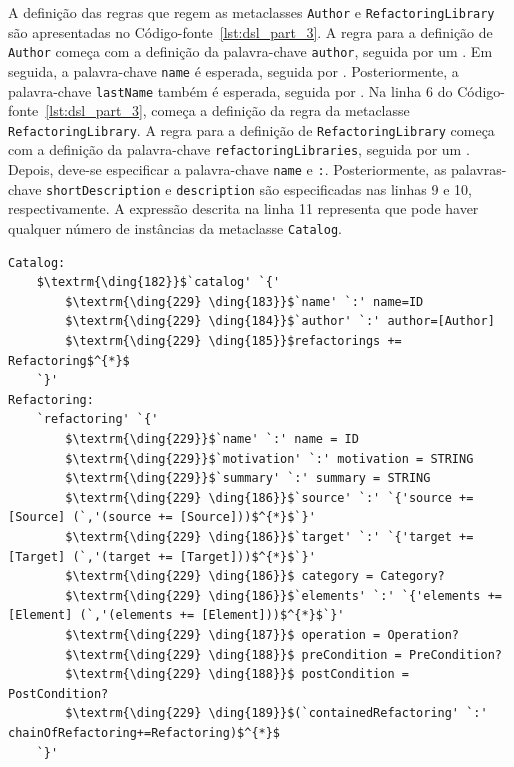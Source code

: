 A definição das regras que regem as metaclasses \texttt{Author} e \texttt{RefactoringLibrary} são apresentadas no Código-fonte~\ref{lst:dsl_part_3}. A regra para a definição de \texttt{Author} começa com a definição da palavra-chave \texttt{author}, seguida por um \aspas{\{}. Em seguida, a palavra-chave \texttt{name} é esperada, seguida por \aspas{\texttt{:}} . Posteriormente, a palavra-chave \texttt{lastName} também é esperada, seguida por \aspas{\texttt{:}} . Na linha 6 do Código-fonte~\ref{lst:dsl_part_3}, começa a definição da regra da metaclasse \texttt{RefactoringLibrary}. A regra para a definição de \texttt{RefactoringLibrary} começa com a definição da palavra-chave \texttt{refactoringLibraries}, seguida por um \aspas{\{}. Depois, deve-se especificar a palavra-chave \texttt{name} e \texttt{:}. Posteriormente, as palavras-chave \texttt{shortDescription} e \texttt{description} são especificadas nas linhas 9 e 10, respectivamente. A expressão descrita na linha 11 representa que pode haver qualquer número de instâncias da metaclasse \texttt{Catalog}.

\begin{lstlisting}[language=Xtext, frame=single, basicstyle=\scriptsize, mathescape=true, label={lst:dsl_part_4}, caption={Gramática da DSL - parte 4}]
Catalog:
	$\textrm{\ding{182}}$`catalog' `{' 
		$\textrm{\ding{229} \ding{183}}$`name' `:' name=ID
		$\textrm{\ding{229} \ding{184}}$`author' `:' author=[Author]
		$\textrm{\ding{229} \ding{185}}$refactorings += Refactoring$^{*}$
	`}'
Refactoring:
	`refactoring' `{' 
		$\textrm{\ding{229}}$`name' `:' name = ID
		$\textrm{\ding{229}}$`motivation' `:' motivation = STRING
		$\textrm{\ding{229}}$`summary' `:' summary = STRING
		$\textrm{\ding{229} \ding{186}}$`source' `:' `{'source += [Source] (`,'(source += [Source]))$^{*}$`}'
		$\textrm{\ding{229} \ding{186}}$`target' `:' `{'target += [Target] (`,'(target += [Target]))$^{*}$`}'
		$\textrm{\ding{229} \ding{186}}$ category = Category?
		$\textrm{\ding{229} \ding{186}}$`elements' `:' `{'elements += [Element] (`,'(elements += [Element]))$^{*}$`}'
		$\textrm{\ding{229} \ding{187}}$ operation = Operation?
		$\textrm{\ding{229} \ding{188}}$ preCondition = PreCondition?
		$\textrm{\ding{229} \ding{188}}$ postCondition = PostCondition?
		$\textrm{\ding{229} \ding{189}}$(`containedRefactoring' `:' chainOfRefactoring+=Refactoring)$^{*}$
	`}'
\end{lstlisting}

